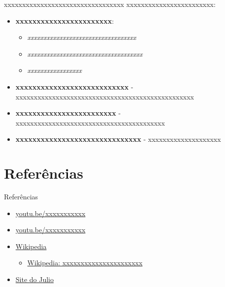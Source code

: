 \documentclass[xcolor=x11names,compress]{beamer}
\renewcommand{\(}{\begin{columns}}
\renewcommand{\)}{\end{columns}}
\newcommand{\<}[1]{\begin{column}{#1}}
\renewcommand{\>}{\end{column}}
\begin{document}
\begin{frame}{xxxxxxxxxxxxxxxxxxxxxxxxxxxxxxxxx}
xxxxxxxxxxxxxxxxxxxxxxxx:
\begin{itemize}
    \item \textbf{xxxxxxxxxxxxxxxxxxxxxxx}:
    \begin{itemize}
        \item \it{xxxxxxxxxxxxxxxxxxxxxxxxxxxxxxxxxx}
        \item \it{xxxxxxxxxxxxxxxxxxxxxxxxxxxxxxxxxxxx}
        \item \it{xxxxxxxxxxxxxxxxx}
    \end{itemize}
    \pause

    \item \textbf{xxxxxxxxxxxxxxxxxxxxxxxxxxx} - xxxxxxxxxxxxxxxxxxxxxxxxxxxxxxxxxxxxxxxxxxxxxxxxx
    \pause

    \item \textbf{xxxxxxxxxxxxxxxxxxxxxxxx} - xxxxxxxxxxxxxxxxxxxxxxxxxxxxxxxxxxxxxxxxx
    \pause

    \item \textbf{xxxxxxxxxxxxxxxxxxxxxxxxxxxxxx} - xxxxxxxxxxxxxxxxxxxx
\end{itemize}
\end{frame}


\section{Referências}
\begin{frame}{Referências}

\begin{itemize}

    \item \href{https://youtu.be/xxxxxxxxxxx}{youtu.be/xxxxxxxxxxx}
    \item \href{https://youtu.be/xxxxxxxxxxx}{youtu.be/xxxxxxxxxxx}

    \item \href{https://www.wikipedia.org/}{Wikipedia}
    \begin{itemize}
        \item \href{https://en.wikipedia.org/wiki/xxxxxxxxxxxxxxxxxxxxxx}{Wikipedia: xxxxxxxxxxxxxxxxxxxxxx}
    \end{itemize}

    \item \href{https://juliobs.com}{Site do Julio}

\end{itemize}

\end{frame}
\end{document}

